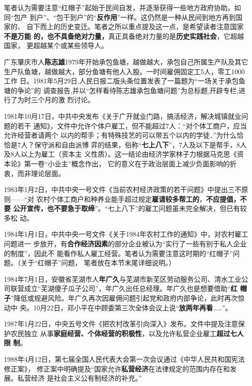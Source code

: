 笔者认为需要注意“红帽子”起始于民间自发，并逐渐获得一些地方政府协助。如同“包产
到户”、“包干到户”的“\textbf{反作用}”一样。这仍然是一种从民间到地方再到国家的、
自下而上的历史变迁。笔者之所以重点提及这一点，是希望读者注意国家\textbf{不是万能
  的，也不具备绝对力量，}真正具备绝对力量的是\textbf{历史实践社会}，它超越国家，
更超越某个或某些领导人。

广东肇庆市人\textbf{陈志雄}1979年开始承包鱼塘，越做越大，承包自己所属生产队及其它
生产队鱼塘，越做越大，部分鱼塘有他人入股。一时间雇佣固定工5人，零工1000工作
日。1981年5月29日,人民日报二版头条位置发表了一篇题为“一场关于承包鱼塘的争论”的
调查报告,并以“怎样看待陈志雄承包鱼塘问题”为总标题,开辟专栏,进行了为时三个月的激
烈讨论。

1981年10月17日，中共中央发布《关于广开就业门路，搞活经济，解决城镇就业问题的若干
通知》，文件中允许个体户雇工，但不能超过7人：“对个体工商户，应当允许经营者请两个
以内的帮手；有特殊技艺的可以带五个以内的学徒．”为什么恰恰是7人？保守派和自由派博
弈的结果，俗称“\textbf{七上八下}”，7人及以下是帮手，8人及8人以上为雇工（资本主
义性质）。这一结论由经济学家林子力根据马克思《资本论》第一卷“小业主”概念作出，
它的意义在于政治层面上减少负面影响的折衷，而非理论层面。

1983年1月2日，中共中央一号文件《当前农村经济政策的若干问题》中提出三不原则——“对
农村个体工商户和种养业能手超过规定\textbf{雇请较多帮工的}，\textbf{不应提倡，不要
  公开宣传，也不要急于取缔}”。“七上八下”的雇工问题虽未完全解决，但已有较多松
动。

1984年1月1日，中共中央一号文件《关于1984年农村工作的通知》中，对农村雇工问题进一
步放开，有\textbf{合作经济因素}的部分企业被认为“实行了一些有别于私人企业的制度”，因此不
能看作私人雇工经营。笔者认为需要注意这时期的“红帽子”问题。（关于“红帽子”问题，
笔者放在本节末尾详细说明。）

1984年7月1日，安徽省芜湖市人\textbf{年广久}与芜湖市新芜区劳动服务公司、清水工业公
司联营成立“芜湖傻子瓜子公司”，年广久出任总经理。年广久也是想要借助“\textbf{红
  帽子}”降低或规避风险。年广久再次因雇佣问题引起党和政府内部争论，此时再次惊动中
央。10月22日，邓小平在中顾委第三次全体会议上说“\textbf{放两年再看}……”。

1987年1月22日，中央五号文件《把农村改革引向深入》发布。文件中提及注意保护农民独立
从事\textbf{家庭经营、个体经营的积极性}，以及允许私营企业雇工\textbf{超过七人限
  制}。

1988年4月12日，第七届全国人民代表大会第一次会议通过《中华人民共和国宪法修正案》，
修正案中明确提及“国家允许\textbf{私营经济}在法律规定的范围内存在和发展。私营经济
是社会主义公有制经济的补充。”

